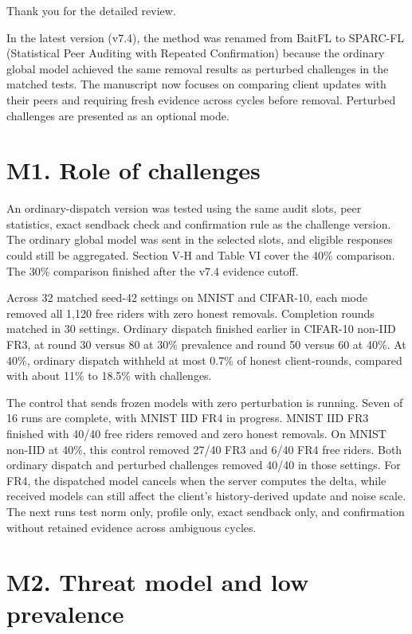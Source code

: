 \documentclass[11pt,a4paper]{article}
\begin{document}
Thank you for the detailed review.

In the latest version (v7.4), the method was renamed from BaitFL to
SPARC-FL (Statistical Peer Auditing with Repeated Confirmation) because
the ordinary global model achieved the same removal results as perturbed
challenges in the matched tests. The manuscript now focuses on comparing
client updates with their peers and requiring fresh evidence across cycles
before removal. Perturbed challenges are presented as an optional mode.

\section*{M1. Role of challenges}

An ordinary-dispatch version was tested using the same audit slots, peer
statistics, exact sendback check and confirmation rule as the challenge
version. The ordinary global model was sent in the selected slots, and
eligible responses could still be aggregated. Section V-H and Table VI
cover the 40\% comparison. The 30\% comparison finished after the v7.4
evidence cutoff.

Across 32 matched seed-42 settings on MNIST and CIFAR-10, each mode removed
all 1,120 free riders with zero honest removals. Completion rounds matched
in 30 settings. Ordinary dispatch finished earlier in CIFAR-10 non-IID
FR3, at round 30 versus 80 at 30\% prevalence and round 50 versus 60 at 40\%.
At 40\%, ordinary dispatch withheld at most 0.7\% of honest client-rounds,
compared with about 11\% to 18.5\% with challenges.

The control that sends frozen models with zero perturbation is running.
Seven of 16 runs are complete, with MNIST IID FR4 in progress. MNIST IID FR3 finished with 40/40 free riders removed and zero honest removals. On MNIST
non-IID at 40\%, this control removed 27/40 FR3 and 6/40 FR4 free riders.
Both ordinary dispatch and perturbed challenges removed 40/40 in those
settings. For FR4, the dispatched model cancels when the server computes
the delta, while received models can still affect the client's
history-derived update and noise scale. The next runs test norm only,
profile only, exact sendback only, and confirmation without retained
evidence across ambiguous cycles.

\section*{M2. Threat model and low prevalence}
\end{document}
